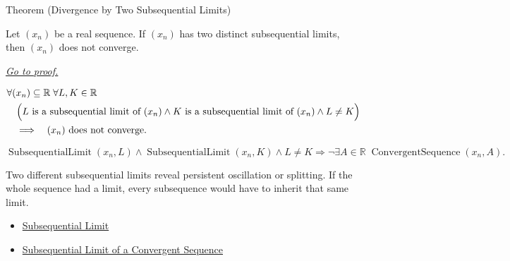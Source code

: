 \begin{theorembox}{Theorem (Divergence by Two Subsequential Limits)}
\begin{theorem}
\label{thm:divergence-by-two-subsequential-limits}
Let $(x_n)$ be a real sequence. If $(x_n)$ has two distinct subsequential
limits, then $(x_n)$ does not converge.

\smallskip
\noindent
\hyperref[prf:divergence-by-two-subsequential-limits]{\textit{Go to proof.}}
\end{theorem}
\end{theorembox}

\begin{remark*}
\[
\begin{aligned}
&\forall (x_n)\subseteq\mathbb{R}\;\forall L,K\in\mathbb{R}\\
&\quad\Bigl(
  L\text{ is a subsequential limit of }(x_n)
  \land
  K\text{ is a subsequential limit of }(x_n)
  \land
  L\neq K
\Bigr)\\
&\quad\Longrightarrow\quad
\text{$(x_n)$ does not converge}.
\end{aligned}
\]
\end{remark*}

\begin{remark*}
\[
\operatorname{SubsequentialLimit}(x_n,L)
\land
\operatorname{SubsequentialLimit}(x_n,K)
\land
L\neq K
\Longrightarrow
\neg\exists A\in\mathbb{R}\;\operatorname{ConvergentSequence}(x_n,A).
\]
\end{remark*}

\begin{remark*}[Interpretation]
Two different subsequential limits reveal persistent oscillation or splitting.
If the whole sequence had a limit, every subsequence would have to inherit
that same limit.
\end{remark*}

\begin{dependencies}
\begin{itemize}
  \item \hyperref[def:subsequential-limit]{Subsequential Limit}
  \item \hyperref[thm:subsequential-limit-of-convergent-sequence]{Subsequential Limit of a Convergent Sequence}
\end{itemize}
\end{dependencies}


